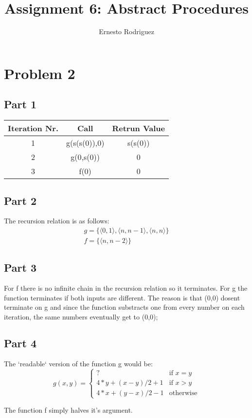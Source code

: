 \documentclass{article}
\title{Assignment 6: Abstract Procedures}
\author{Ernesto Rodriguez}
\begin{document}
\maketitle

\section{Problem 2}

\subsection{Part 1}

\begin{tabular}{|c|c|c|}
  \hline
  {\bf Iteration Nr.} & {\bf Call} & {\bf Retrun Value}\\
  \hline
  1 & g(s(s(0)),0) & s(s(0)) \\
  \hline
  2 & g(0,s(0)) & 0 \\
  \hline
  3 & f(0) & 0 \\
  \hline
\end{tabular}
  
\subsection{Part 2}

The recursion relation is as follows:
\[
\begin{array}{ll}
  g=\{\langle 0,1 \rangle,\langle n,n-1\rangle,\langle n,n \rangle\} \\
  f=\{\langle n,n-2 \rangle \}
\end{array}
\]

\subsection{Part 3}
For f there is no infinite chain in the recursion relation so it terminates. For g the function terminates if both inputs are different. The reason is that (0,0) dosent terminate on g and since the function substracts one from every number on each iteration, the same numbers eventually get to (0,0);
\subsection{Part 4}
The `readable` version of the function g would be:
\[
g(x,y) =
\left\{
	\begin{array}{ll}
		?  & \mbox{if } x=y \\
		4*y+(x-y)/2 +1 & \mbox{if } x>y\\
                4*x+(y-x)/2 -1 & \mbox{otherwise}
	\end{array}
\right.
\]

The function f simply halves it's argument.
\end{document}
